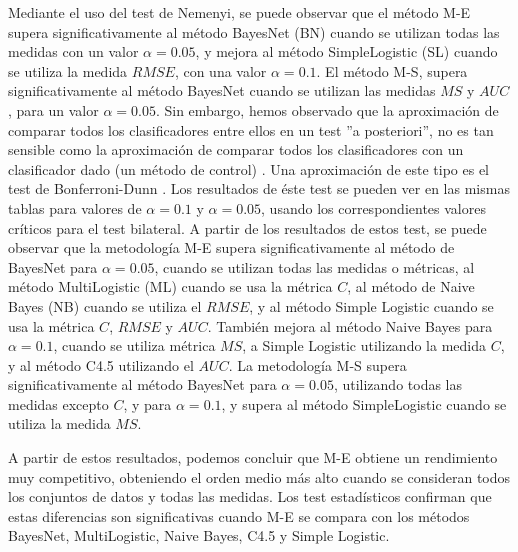 Mediante el uso del test de Nemenyi, se puede observar que el
método M-E supera significativamente al método BayesNet (BN) cuando se utilizan todas las
medidas con un valor $\alpha=0.05$, y mejora al método SimpleLogistic (SL) cuando se
utiliza la medida $RMSE$, con una valor $\alpha=0.1$. El método M-S, supera
significativamente al método BayesNet cuando se utilizan las medidas $MS$ y $AUC$, para un
valor $\alpha=0.05$. Sin embargo, hemos observado que la aproximación de comparar todos
los clasificadores entre ellos en un test ''a posteriori'', no es tan sensible como la
aproximación de comparar todos los clasificadores con un clasificador dado (un
método de control) \cite{Demsar2006}. Una aproximación de este tipo es el test de
Bonferroni-Dunn \cite{Dunn1961,Hochberg1987}. Los resultados de éste test se pueden ver en las
mismas tablas para valores de $\alpha=0.1$ y $\alpha=0.05$, usando los
correspondientes valores críticos para el test bilateral. A partir  de los resultados de
estos test, se puede observar que la metodología M-E supera significativamente al método
de BayesNet para $\alpha=0.05$, cuando se utilizan todas las medidas o métricas, al método
MultiLogistic (ML) cuando se usa la métrica $C$, al método de Naive Bayes (NB) cuando se
utiliza el $RMSE$, y al método Simple Logistic cuando se usa la métrica $C$, $RMSE$ y
$AUC$. También mejora al método Naive Bayes para $\alpha=0.1$, cuando se utiliza métrica
$MS$, a Simple Logistic utilizando la medida $C$, y al método C4.5 utilizando el
$AUC$. La metodología M-S supera significativamente al método BayesNet para
$\alpha=0.05$, utilizando todas las medidas excepto $C$, y para $\alpha=0.1$, y supera
al método SimpleLogistic cuando se utiliza la medida $MS$.

A partir de estos resultados, podemos concluir que M-E obtiene un rendimiento muy competitivo,
obteniendo el orden medio más alto cuando se consideran todos los conjuntos de datos y todas las
medidas. Los test estadísticos confirman que estas diferencias son significativas cuando M-E se
compara con los métodos BayesNet, MultiLogistic, Naive Bayes, C4.5 y Simple Logistic.

